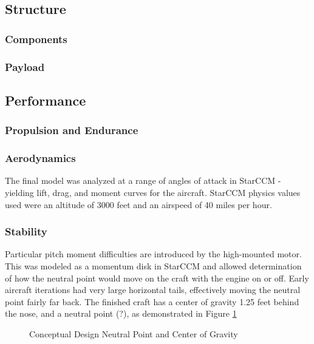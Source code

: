 \documentclass[letterpaper,12pt]{article}
\begin{document}
\subsection{Structure}
\subsubsection{Components}
\subsubsection{Payload}

\subsection{Performance}
\subsubsection{Propulsion and Endurance} %

\subsubsection{Aerodynamics}
The final model was analyzed at a range of angles of attack in StarCCM - yielding lift, drag, and moment curves for the aircraft. StarCCM physics values used were an altitude of 3000 feet and an airspeed of 40 miles per hour.

\subsubsection{Stability}
Particular pitch moment difficulties are introduced by the high-mounted motor. This was modeled as a momentum disk in StarCCM and allowed determination of how the neutral point would move on the craft with the engine on or off. Early aircraft iterations had very large horizontal tails, effectively moving the neutral point fairly far back. The finished craft has a center of gravity 1.25 feet behind the nose, and a neutral point (?), as demonstrated in Figure \ref{fig:neutralpoint}

\begin{figure}
    \centering
    \caption{Conceptual Design Neutral Point and Center of Gravity}
    \label{fig:neutralpoint}
\end{figure}
\end{document}

